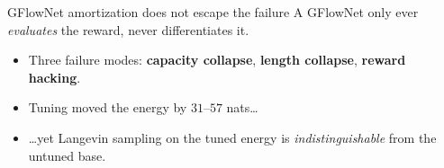 \documentclass{beamer}
\begin{document}
\begin{frame}{GFlowNet amortization does not escape the failure}
  \vspace{0.3em}
  {\small A GFlowNet only ever \emph{evaluates} the reward, never differentiates it.}
  \vspace{0.8em}
  \begin{itemize}\small
    \item Three failure modes: \textbf{capacity collapse}, \textbf{length collapse}, \textbf{reward hacking}.
    \item Tuning moved the energy by $31$--$57$ nats\ldots
    \item \ldots yet Langevin sampling on the tuned energy is \emph{indistinguishable} from the untuned base.
  \end{itemize}
  \vspace{0.9em}
  \begin{center}
  \end{center}
\end{frame}
\end{document}
